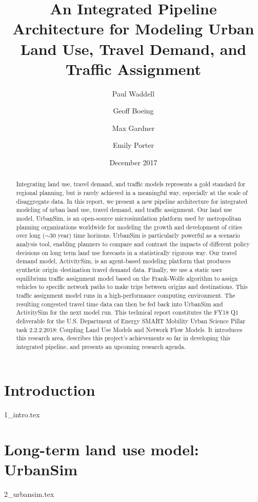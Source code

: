 \documentclass{report}
\title{An Integrated Pipeline Architecture for Modeling Urban Land Use, Travel Demand, and Traffic Assignment}
\author[1]{Paul Waddell}
\author[1]{Geoff Boeing}
\author[2]{Max Gardner}
\author[2]{Emily Porter}
\affil[1]{Department of City and Regional Planning, University of California, Berkeley}
\affil[2]{Department of Civil and Environmental Engineering, University of California, Berkeley}
\date{December 2017}
\begin{document}
\maketitle

\begin{abstract}
Integrating land use, travel demand, and traffic models represents a gold standard for regional planning, but is rarely achieved in a meaningful way, especially at the scale of disaggregate data. In this report, we present a new pipeline architecture for integrated modeling of urban land use, travel demand, and traffic assignment. Our land use model, UrbanSim, is an open-source microsimulation platform used by metropolitan planning organizations worldwide for modeling the growth and development of cities over long ($\sim$30 year) time horizons. UrbanSim is particularly powerful as a scenario analysis tool, enabling planners to compare and contrast the impacts of different policy decisions on long term land use forecasts in a statistically rigorous way. Our travel demand model, ActivitySim, is an agent-based modeling platform that produces synthetic origin--destination travel demand data. Finally, we use a static user equilibrium traffic assignment model based on the Frank-Wolfe algorithm to assign vehicles to specific network paths to make trips between origins and destinations. This traffic assignment model runs in a high-performance computing environment. The resulting congested travel time data can then be fed back into UrbanSim and ActivitySim for the next model run. This technical report constitutes the FY18 Q1 deliverable for the U.S. Department of Energy SMART Mobility Urban Science Pillar task 2.2.2.2018: Coupling Land Use Models and Network Flow Models. It introduces this research area, describes this project's achievements so far in developing this integrated pipeline, and presents an upcoming research agenda.
\end{abstract}

\tableofcontents
\newpage

\section{Introduction}
\label{sec:intro}
{1_intro.tex}

\section{Long-term land use model: UrbanSim}
\label{sec:urbansim}
{2_urbansim.tex}
\end{document}
